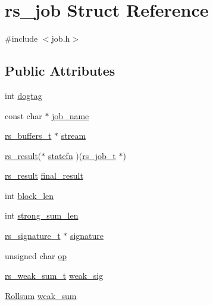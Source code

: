 \hypertarget{structrs__job}{}\section{rs\+\_\+job Struct Reference}
\label{structrs__job}


{\ttfamily \#include $<$job.\+h$>$}

\subsection*{Public Attributes}
\begin{DoxyCompactItemize}
\item 
int \hyperlink{structrs__job_a63f809ce5fec21d4bb6344e77b092f10}{dogtag}
\item 
const char $\ast$ \hyperlink{structrs__job_a1adfb711cdf2198c0f053db20b19292d}{job\+\_\+name}
\item 
\hyperlink{librsync_8h_abf9f543dbfe5c1e60c8ed1c93d087767}{rs\+\_\+buffers\+\_\+t} $\ast$ \hyperlink{structrs__job_a881d6a21bd30b989f5f74a754bec6d8d}{stream}
\item 
\hyperlink{librsync_8h_a7feb858ceba3b8f3cf048d49be108253}{rs\+\_\+result}($\ast$ \hyperlink{structrs__job_aa789990d61f5eadc6a26aeedf4bec765}{statefn} )(\hyperlink{librsync_8h_a99e68494fe0ac6b84f4ecfb646690c35}{rs\+\_\+job\+\_\+t} $\ast$)
\item 
\hyperlink{librsync_8h_a7feb858ceba3b8f3cf048d49be108253}{rs\+\_\+result} \hyperlink{structrs__job_abe5bd8bd64e63678da2efdf707736cce}{final\+\_\+result}
\item 
int \hyperlink{structrs__job_a72c83ee9e50622c59897e86886809e30}{block\+\_\+len}
\item 
int \hyperlink{structrs__job_a8eb87d0bd34c3acc2ff3c1545a730fa4}{strong\+\_\+sum\+\_\+len}
\item 
\hyperlink{librsync_8h_afb2a9cb505daeb8e519d06686f5caabf}{rs\+\_\+signature\+\_\+t} $\ast$ \hyperlink{structrs__job_ac8b7a197f196b0eabdd1dd2de0f7852f}{signature}
\item 
unsigned char \hyperlink{structrs__job_a21558da1d932702b454731d99966c8b4}{op}
\item 
\hyperlink{librsync_8h_a47fc8f5420a15ce91c13457d1522ad3c}{rs\+\_\+weak\+\_\+sum\+\_\+t} \hyperlink{structrs__job_a89ca09a7be40ac8e584917d577b22f66}{weak\+\_\+sig}
\item 
\hyperlink{rollsum_8h_a3a9f75d5daf2c1bfbf6e3829b325c81e}{Rollsum} \hyperlink{structrs__job_a4415237bfe78e4faced69db92503d705}{weak\+\_\+sum}

\end{DoxyCompactItemize}
